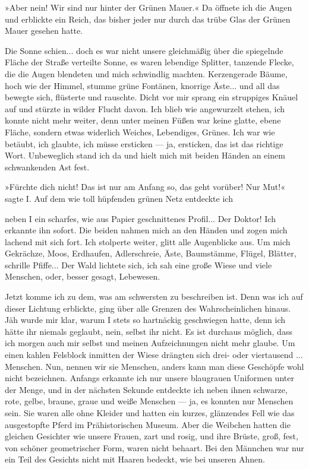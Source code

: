 »Aber nein! Wir sind nur hinter der Grünen Mauer.« Da öffnete ich
die Augen und erblickte ein Reich, das bisher jeder nur durch das
trübe Glas der Grünen Mauer gesehen hatte.

Die Sonne schien... doch es war nicht unsere gleichmäßig über die
spiegelnde Fläche der Straße verteilte Sonne, es waren lebendige
Splitter, tanzende Flecke, die die Augen blendeten und mich
schwindlig machten. Kerzengerade Bäume, hoch wie der Himmel, stumme
grüne Fontänen, knorrige Äste... und all das bewegte sich,
flüsterte und rauschte. Dicht vor mir sprang ein struppiges Knäuel
auf und stürzte in wilder Flucht davon. Ich blieb wie angewurzelt
stehen, ich konnte nicht mehr weiter, denn unter meinen Füßen war
keine glatte, ebene Fläche, sondern etwas widerlich Weiches,
Lebendiges, Grünes. Ich war wie betäubt, ich glaubte, ich müsse
ersticken — ja, ersticken, das ist das richtige Wort. Unbeweglich
stand ich da und hielt mich mit beiden Händen an einem schwankenden
Ast fest.

»Fürchte dich nicht! Das ist nur am Anfang so, das geht vorüber!
Nur Mut!« sagte I. Auf dem wie toll hüpfenden grünen Netz entdeckte
ich

neben I ein scharfes, wie aus Papier geschnittenes Profil... Der
Doktor! Ich erkannte ihn sofort. Die beiden nahmen mich an den
Händen und zogen mich lachend mit sich fort. Ich stolperte weiter,
glitt alle Augenblicke aus. Um mich Gekrächze, Moos, Erdhaufen,
Adlerschreie, Äste, Baumstämme, Flügel, Blätter, schrille Pfiffe...
Der Wald lichtete sich, ich sah eine große Wiese und viele
Menschen, oder, besser gesagt, Lebewesen.

Jetzt komme ich zu dem, was am schwersten zu beschreiben ist. Denn
was ich auf dieser Lichtung erblickte, ging über alle Grenzen des
Wahrscheinlichen hinaus. Jäh wurde mir klar, warum I stets so
hartnäckig geschwiegen hatte, denn ich hätte ihr niemals geglaubt,
nein, selbst ihr nicht. Es ist durchaus möglich, dass ich morgen
auch mir selbst und meinen Aufzeichnungen nicht mehr glaube. Um
einen kahlen Felsblock inmitten der Wiese drängten sich drei- oder
viertausend ... Menschen. Nun, nennen wir sie Menschen, anders kann
man diese Geschöpfe wohl nicht bezeichnen. Anfangs erkannte ich nur
unsere blaugrauen Uniformen unter der Menge, und in der nächsten
Sekunde entdeckte ich neben ihnen schwarze, rote, gelbe, braune,
graue und weiße Menschen — ja, es konnten nur Menschen sein. Sie
waren alle ohne Kleider und hatten ein kurzes, glänzendes Fell wie
das ausgestopfte Pferd im Prähistorischen Museum. Aber die Weibchen
hatten die gleichen Gesichter wie unsere Frauen, zart und rosig,
und ihre Brüste, groß, fest, von schöner geometrischer Form, waren
nicht behaart. Bei den Männchen war nur ein Teil des Gesichts nicht
mit Haaren bedeckt, wie bei unseren Ahnen.

